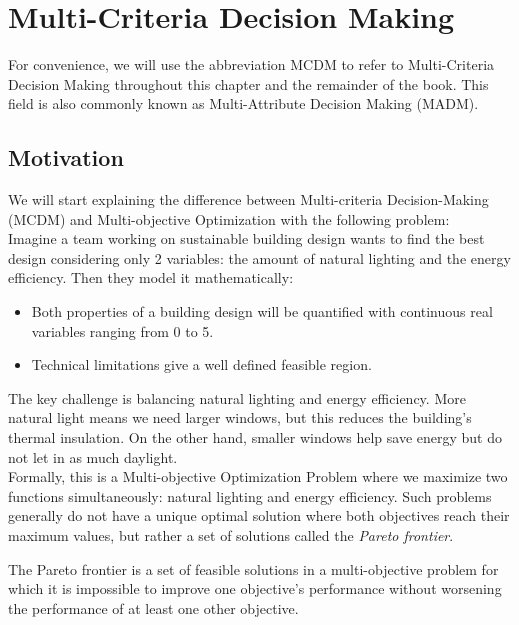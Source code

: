 \chapter{Multi-Criteria Decision Making}

For convenience, we will use the abbreviation MCDM to refer to Multi-Criteria Decision Making throughout this chapter and the remainder of the book. This field is also commonly known as Multi-Attribute Decision Making (MADM).



\section*{Motivation}
We will start explaining the difference between Multi-criteria Decision-Making (MCDM) and Multi-objective Optimization with the following problem:\\

Imagine a team working on \textnormal{sustainable building design} wants to find the best design considering only 2 variables: the amount of natural lighting and the energy efficiency. Then they model it mathematically:\vspace{-0.7em}
\begin{itemize}
    \item Both properties of a building design will be quantified with continuous real variables ranging from 0 to 5.\vspace{-0.8em}
    \item Technical limitations give a well defined feasible region.\vspace{-0.7em}
\end{itemize}
The key challenge is balancing natural lighting and energy efficiency. More natural light means we need larger windows, but this reduces the building's thermal insulation. On the other hand, smaller windows help save energy but do not let in as much daylight.\\

Formally, this is a Multi-objective Optimization Problem where we maximize two functions simultaneously: natural lighting and energy efficiency. Such problems generally do not have a unique optimal solution where both objectives reach their maximum values, but rather a set of solutions called the \textit{Pareto frontier}. 


\begin{definition}
The Pareto frontier is a set of feasible solutions in a multi-objective problem for which it is impossible to improve one objective's performance without worsening the performance of at least one other objective.
\end{definition}


